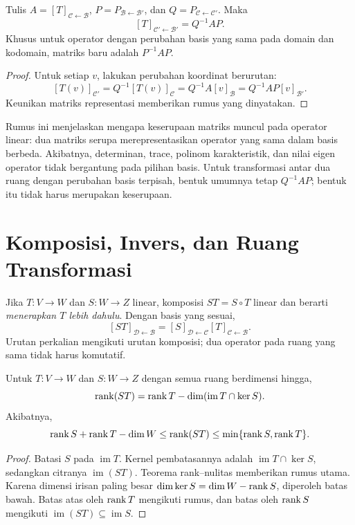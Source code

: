 \begin{teorema}
    Tulis $A=[T]_{\mathcal C\leftarrow\mathcal B}$,
    $P=P_{\mathcal B\leftarrow\mathcal B'}$, dan
    $Q=P_{\mathcal C\leftarrow\mathcal C'}$.
    Maka
    \[
        [T]_{\mathcal C'\leftarrow\mathcal B'}=Q^{-1}AP.
    \]
    Khusus untuk operator dengan perubahan basis yang sama
    pada domain dan kodomain, matriks baru adalah $P^{-1}AP$.
\end{teorema}
\begin{proof}
    Untuk setiap $v$, lakukan perubahan koordinat berurutan:
    \[
        [T(v)]_{\mathcal C'}
        =Q^{-1}[T(v)]_{\mathcal C}
        =Q^{-1}A[v]_{\mathcal B}
        =Q^{-1}AP[v]_{\mathcal B'}.
    \]
    Keunikan matriks representasi memberikan rumus yang dinyatakan.
\end{proof}

Rumus ini menjelaskan mengapa keserupaan matriks muncul pada
operator linear: dua matriks serupa merepresentasikan operator
yang sama dalam basis berbeda. Akibatnya, determinan, trace,
polinom karakteristik, dan nilai eigen operator tidak bergantung
pada pilihan basis. Untuk transformasi antar dua ruang dengan
perubahan basis terpisah, bentuk umumnya tetap $Q^{-1}AP$;
bentuk itu tidak harus merupakan keserupaan.

\section{Komposisi, Invers, dan Ruang Transformasi}

Jika $T:V\to W$ dan $S:W\to Z$ linear, komposisi
$ST=S\circ T$ linear dan berarti \emph{menerapkan $T$ lebih dahulu}.
Dengan basis yang sesuai,
\[
    [ST]_{\mathcal D\leftarrow\mathcal B}
      =[S]_{\mathcal D\leftarrow\mathcal C}
       [T]_{\mathcal C\leftarrow\mathcal B}.
\]
Urutan perkalian mengikuti urutan komposisi; dua operator pada
ruang yang sama tidak harus komutatif.

\begin{teorema}
    Untuk $T:V\to W$ dan $S:W\to Z$ dengan semua ruang
    berdimensi hingga,
    \[
        \operatorname{rank}(ST)=\operatorname{rank} T-\dim(\operatorname{im}T\cap\ker S).
    \]
    Akibatnya,
    \[
        \operatorname{rank} S+\operatorname{rank} T-\dim W
        \le\operatorname{rank}(ST)\le\min\{\operatorname{rank} S,\operatorname{rank} T\}.
    \]
\end{teorema}
\begin{proof}
    Batasi $S$ pada $\operatorname{im}T$.
    Kernel pembatasannya adalah $\operatorname{im}T\cap\ker S$,
    sedangkan citranya $\operatorname{im}(ST)$.
    Teorema rank--nulitas memberikan rumus utama.
    Karena dimensi irisan paling besar $\dim\ker S
    =\dim W-\operatorname{rank} S$, diperoleh batas bawah.
    Batas atas oleh $\operatorname{rank} T$ mengikuti rumus, dan batas oleh
    $\operatorname{rank} S$ mengikuti $\operatorname{im}(ST)\subseteq\operatorname{im}S$.
\end{proof}

